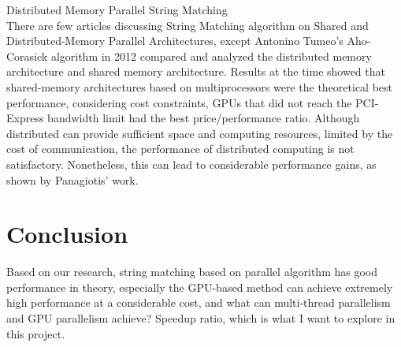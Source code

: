 \documentclass[11pt]{article}       %
\begin{document}
Distributed Memory Parallel String Matching\\
There are few articles discussing String Matching algorithm on Shared and Distributed-Memory Parallel Architectures, except Antonino Tumeo's Aho-Corasick algorithm in 2012 compared and analyzed the distributed memory architecture and shared memory architecture\cite{Distributed-Memory}. Results at the time showed that shared-memory architectures based on multiprocessors were the theoretical best performance, considering cost constraints, GPUs that did not reach the PCI-Express bandwidth limit had the best price/performance ratio. Although distributed can provide sufficient space and computing resources, limited by the cost of communication, the performance of distributed computing is not satisfactory. Nonetheless, this can lead to considerable performance gains, as shown by Panagiotis' work\cite{MPI}.\\

\section{Conclusion} \label{Conclu}

Based on our research, string matching based on parallel algorithm has good performance in theory, especially the GPU-based method can achieve extremely high performance at a considerable cost, and what can multi-thread parallelism and GPU parallelism achieve? Speedup ratio, which is what I want to explore in this project.
\end{document}
